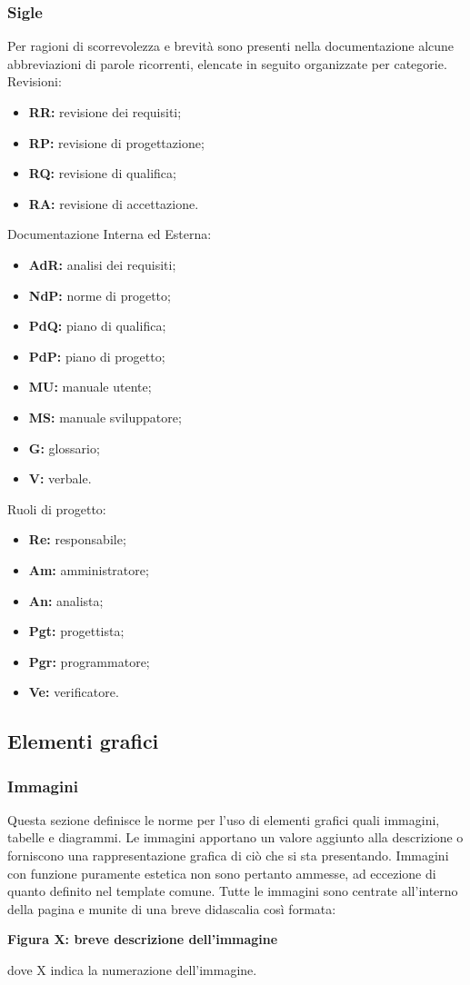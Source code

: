 \subsubsection{Sigle}
Per ragioni di scorrevolezza e brevità sono presenti nella documentazione alcune abbreviazioni di parole ricorrenti, elencate in seguito organizzate per categorie.\\
Revisioni:
\begin{itemize}
  \item \textbf{RR:} revisione dei requisiti;
	\item \textbf{RP:} revisione di progettazione;
 	\item \textbf{RQ:} revisione di qualifica;
	\item \textbf{RA:} revisione di accettazione.
\end{itemize}
Documentazione Interna ed Esterna:
\begin{itemize}
  \item \textbf{AdR:} analisi dei requisiti;
	\item \textbf{NdP:} norme di progetto;
	\item \textbf{PdQ:} piano di qualifica;
	\item \textbf{PdP:} piano di progetto;
	\item \textbf{MU:} manuale utente;
	\item \textbf{MS:} manuale sviluppatore;
	\item \textbf{G:} glossario;
	\item \textbf{V:} verbale.
\end{itemize}
Ruoli di progetto:
\begin{itemize}
  \item \textbf{Re:} responsabile;
	\item \textbf{Am:} amministratore;
	\item \textbf{An:} analista;
	\item \textbf{Pgt:} progettista;
	\item \textbf{Pgr:} programmatore;
	\item \textbf{Ve:} verificatore.
\end{itemize}
\subsection{Elementi grafici}\label{3.1.9}
\subsubsection{Immagini}\label{3.1.9.1}
Questa sezione definisce le norme per l'uso di elementi grafici quali immagini, tabelle e diagrammi.
Le immagini apportano un valore aggiunto alla descrizione o forniscono una rappresentazione grafica di ciò che si sta presentando. Immagini con funzione puramente estetica non sono pertanto ammesse, ad eccezione di quanto definito nel template comune. Tutte le immagini sono centrate all’interno della pagina e munite di una breve didascalia così formata:
\begin{center}
	\textbf {Figura X: breve descrizione dell'immagine}
\end{center}
dove X indica la numerazione dell'immagine.
